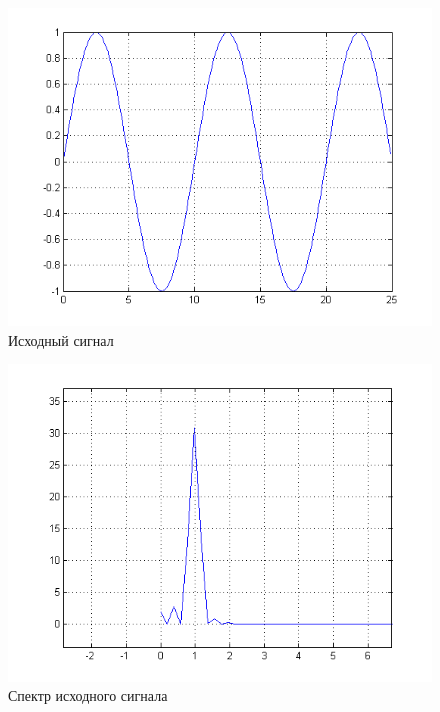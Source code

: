 \documentclass[a4paper, 12pt]{article}
\begin{document}
\begin{figure}[H]
   \includegraphics[scale=0.7]{lab7/src_signal.png}
   \caption{Исходный сигнал}
\end{figure}

\begin{figure}[H]
   \includegraphics[scale=0.7]{lab7/src_signal_spectro.png}
   \caption{Спектр исходного сигнала}
\end{figure}
\end{document}
